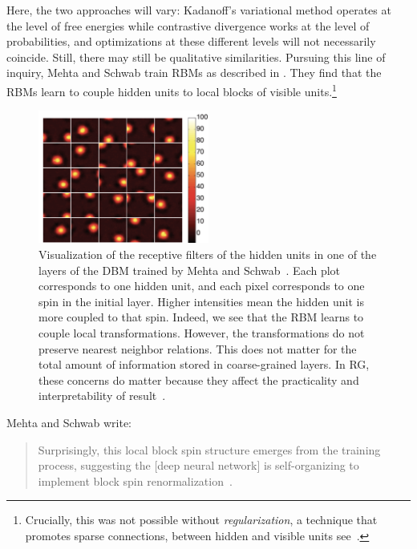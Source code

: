 Here, the two approaches will vary: Kadanoff's variational method
operates at the level of free energies while contrastive divergence
works at the level of probabilities, and optimizations at these
different levels will not necessarily coincide. Still, there may still
be qualitative similarities. Pursuing this line of inquiry, Mehta and
Schwab train RBMs as described in
. They find that the RBMs learn to
couple hidden units to local blocks of visible units.\footnote{
  Crucially, this was not possible without \textit{regularization}, a
  technique that promotes sparse connections, between hidden and
  visible units see~\cite{mehta-review}.}
\begin{figure}[ht]
  \centering \includegraphics[width=0.5\textwidth]{figures/mehta.png}
  \caption{Visualization of the receptive filters of the hidden units
    in one of the layers of the DBM trained by Mehta and
    Schwab~\cite{mehta}. Each plot corresponds to one hidden unit, and
    each pixel corresponds to one spin in the initial layer. Higher
    intensities mean the hidden unit is more coupled to that
    spin. Indeed, we see that the RBM learns to couple local
    transformations. However, the transformations do not preserve
    nearest neighbor relations. This does not matter for the total
    amount of information stored in coarse-grained layers. In RG,
    these concerns do matter because they affect the practicality and
    interpretability of result~\cite{kjr}.\label{fig:fig:mehta} }
\end{figure}

Mehta and Schwab write:%
\begin{quote} Surprisingly, this local block spin structure emerges
  from the training process, suggesting the [deep neural network] is
  self-organizing to implement block spin
  renormalization~\cite{mehta}. %
\end{quote}

